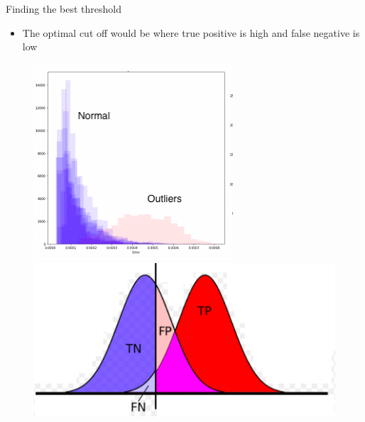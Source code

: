 \documentclass[10pt]{beamer}
\begin{document}
\begin{frame}{Finding the best threshold}
\begin{itemize}
\item The optimal cut off would be where true positive is high and false negative is low
\end{itemize}
\begin{figure}
\includegraphics[width=.35\textwidth]{ExampleDetector}
\includegraphics[width=.55\textwidth]{TNFP}
\end{figure}
\end{frame}
\end{document}
